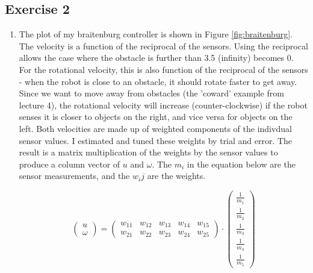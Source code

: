 \documentclass[12pt,a4paper]{article}
\begin{document}
\subsection*{Exercise 2}
\begin{enumerate}[label=(\alph*)]
        \item The plot of my braitenburg controller is shown in Figure \ref{fig:braitenburg}. The velocity is a function of the reciprocal of the sensors. Using the reciprocal allows the case where the obstacle is further than 3.5 (infinity) becomes 0. For the rotational velocity, this is also function of the reciprocal of the sensors - when the robot is close to an obstacle, it should rotate faster to get away. Since we want to move away from obstacles (the 'coward' example from lecture 4), the rotational velocity will increase (counter-clockwise) if the robot senses it is closer to objects on the right, and vice versa for objects on the left. Both velocities are made up of weighted components of the indivdual sensor values. I estimated and tuned these weights by trial and error. The result is a matrix multiplication of the weights by the sensor values to produce a column vector of $u$ and $\omega$. The $m_i$ in the equation below are the sensor measurements, and the $w_ij$ are the weights.

		\begin{equation*}
			\begin{pmatrix}
				u\\
				\omega
			\end{pmatrix}
			=
			\begin{pmatrix}
				w_{11} & w_{12} & w_{13} & w_{14} & w_{15}\\
				w_{21} & w_{22} & w_{23} & w_{24} & w_{25}
			\end{pmatrix}
			\cdot
			\begin{pmatrix}
				\frac{1}{m_1}\\
				\frac{1}{m_2}\\
				\frac{1}{m_3}\\
				\frac{1}{m_4}\\
				\frac{1}{m_5}
			\end{pmatrix}
		\end{equation*}


\end{enumerate}
\end{document}
